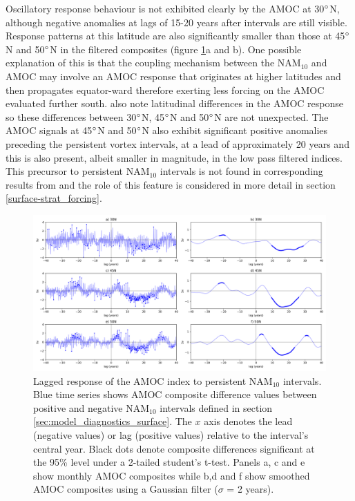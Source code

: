Oscillatory response behaviour is not exhibited clearly by the AMOC at 30$\degree$N, although negative anomalies at lags of 15-20 years after intervals are still visible. Response patterns at this latitude are also significantly smaller than those at 45$\degree$N and 50$\degree$N in the filtered composites (figure \ref{AMOC_comp_NAM}a and b). One possible explanation of this is that the coupling mechanism between the NAM$_{10}$ and AMOC may involve an AMOC response that originates at higher latitudes and then propagates equator-ward therefore exerting less forcing on the AMOC evaluated further south. \cite{zhangLatitudinal2010b} also note latitudinal differences in the AMOC response so these differences between 30$\degree$N, 45$\degree$N and 50$\degree$N are not unexpected. The AMOC signals at 45$\degree$N and 50$\degree$N also exhibit significant positive anomalies preceding the persistent vortex intervals, at a lead of approximately 20 years and this is also present, albeit smaller in magnitude, in the low pass filtered indices. This precursor to persistent NAM$_{10}$ intervals is not found in corresponding results from \cite{reichlerStratospheric2012b} and the role of this feature is considered in more detail in section \ref{surface-strat_forcing}.

\begin{center}
\begin{figure}[h!]
\noindent\includegraphics[width = \linewidth]{Figures/Figures-surface/AMOC_responses_low_and_highf_combined_FINAL.png} 
\caption[Lagged response of the AMOC index to persistent NAM$_{10}$ intervals.]{Lagged response of the AMOC index to persistent NAM$_{10}$ intervals. Blue time series shows AMOC composite difference values between positive and negative NAM$_{10}$ intervals defined in section \ref{sec:model_diagnostics_surface}. The $x$ axis denotes the lead (negative values) or lag (positive values) relative to the interval's central year. Black dots denote composite differences significant at the 95\% level under a 2-tailed student's t-test. Panels a, c and e show monthly AMOC composites while b,d and f show smoothed AMOC composites using a Gaussian filter ($\sigma$ = 2 years).}
\label{AMOC_comp_NAM}
\end{figure}
\end{center}

